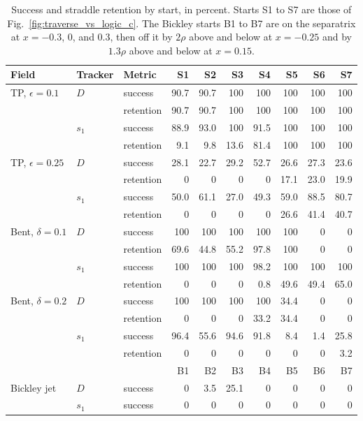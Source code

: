 \documentclass[11pt]{article}
\begin{document}
\begin{table}[t]
\centering
\caption{Success and straddle retention by start, in percent. Starts
S1 to S7 are those of Fig.~\ref{fig:traverse_vs_logic_c}. The Bickley
starts B1 to B7 are on the separatrix at $x = -0.3$, 0, and 0.3, then off
it by $2\rho$ above and below at $x = -0.25$ and by $1.3\rho$ above and
below at $x = 0.15$.}
\label{tab:perstart}
\small
\begin{tabular}{lll rrrrrrr}
\toprule
Field & Tracker & Metric & S1 & S2 & S3 & S4 & S5 & S6 & S7 \\
\midrule
TP, $\epsilon=0.1$ & $D$ & success & 90.7 & 90.7 & 100 & 100 & 100 & 100 & 100 \\
 & & retention & 90.7 & 90.7 & 100 & 100 & 100 & 100 & 100 \\
 & $s_1$ & success & 88.9 & 93.0 & 100 & 91.5 & 100 & 100 & 100 \\
 & & retention & 9.1 & 9.8 & 13.6 & 81.4 & 100 & 100 & 100 \\
\midrule
TP, $\epsilon=0.25$ & $D$ & success & 28.1 & 22.7 & 29.2 & 52.7 & 26.6 & 27.3 & 23.6 \\
 & & retention & 0 & 0 & 0 & 0 & 17.1 & 23.0 & 19.9 \\
 & $s_1$ & success & 50.0 & 61.1 & 27.0 & 49.3 & 59.0 & 88.5 & 80.7 \\
 & & retention & 0 & 0 & 0 & 0 & 26.6 & 41.4 & 40.7 \\
\midrule
Bent, $\delta=0.1$ & $D$ & success & 100 & 100 & 100 & 100 & 100 & 0 & 0 \\
 & & retention & 69.6 & 44.8 & 55.2 & 97.8 & 100 & 0 & 0 \\
 & $s_1$ & success & 100 & 100 & 100 & 98.2 & 100 & 100 & 100 \\
 & & retention & 0 & 0 & 0 & 0.8 & 49.6 & 49.4 & 65.0 \\
\midrule
Bent, $\delta=0.2$ & $D$ & success & 100 & 100 & 100 & 100 & 34.4 & 0 & 0 \\
 & & retention & 0 & 0 & 0 & 33.2 & 34.4 & 0 & 0 \\
 & $s_1$ & success & 96.4 & 55.6 & 94.6 & 91.8 & 8.4 & 1.4 & 25.8 \\
 & & retention & 0 & 0 & 0 & 0 & 0 & 0 & 3.2 \\
\midrule
 & & & B1 & B2 & B3 & B4 & B5 & B6 & B7 \\
Bickley jet & $D$ & success & 0 & 3.5 & 25.1 & 0 & 0 & 0 & 0 \\
 & $s_1$ & success & 0 & 0 & 0 & 0 & 0 & 0 & 0 \\
\bottomrule
\end{tabular}
\end{table}
\end{document}
